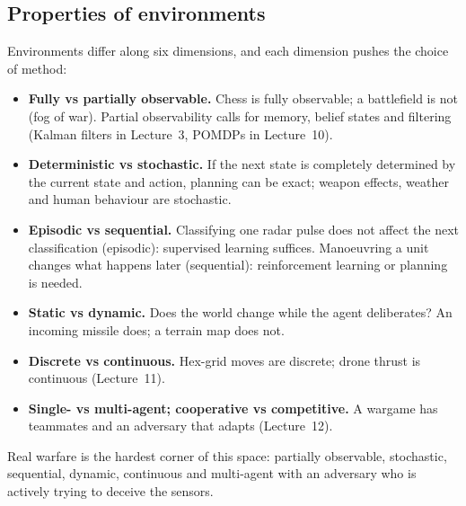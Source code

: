 \documentclass[11pt]{article}
\begin{document}
\subsection{Properties of environments}
Environments differ along six dimensions, and each dimension pushes the choice of method:
\begin{itemize}
\item \textbf{Fully vs partially observable.} Chess is fully observable; a battlefield is not (fog of war). Partial observability calls for memory, belief states and filtering (Kalman filters in Lecture~3, POMDPs in Lecture~10).
\item \textbf{Deterministic vs stochastic.} If the next state is completely determined by the current state and action, planning can be exact; weapon effects, weather and human behaviour are stochastic.
\item \textbf{Episodic vs sequential.} Classifying one radar pulse does not affect the next classification (episodic): supervised learning suffices. Manoeuvring a unit changes what happens later (sequential): reinforcement learning or planning is needed.
\item \textbf{Static vs dynamic.} Does the world change while the agent deliberates? An incoming missile does; a terrain map does not.
\item \textbf{Discrete vs continuous.} Hex-grid moves are discrete; drone thrust is continuous (Lecture~11).
\item \textbf{Single- vs multi-agent; cooperative vs competitive.} A wargame has teammates and an adversary that adapts (Lecture~12).
\end{itemize}
Real warfare is the hardest corner of this space: partially observable, stochastic, sequential, dynamic, continuous and multi-agent with an adversary who is actively trying to deceive the sensors.
\end{document}
